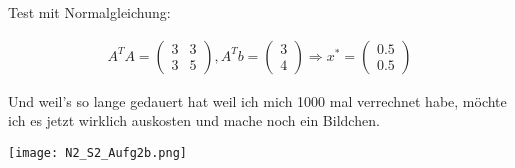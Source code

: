 \documentclass[11pt]{article} %
\begin{document}
\begin{enumerate}[a)]
Test mit Normalgleichung:

\begin{eqnarray*}
A^TA = \begin{pmatrix} 3 & 3 \\ 3  & 5\end{pmatrix}, A^T b = \begin{pmatrix} 3 \\ 4 \end{pmatrix} \Rightarrow x^* = \begin{pmatrix} 0.5 \\ 0.5 \end{pmatrix}
\end{eqnarray*}

Und weil's so lange gedauert hat weil ich mich 1000 mal verrechnet habe, möchte ich es jetzt wirklich auskosten und mache noch ein Bildchen.

\texttt{[image: N2\_S2\_Aufg2b.png]}

\end{enumerate}
\end{document}
